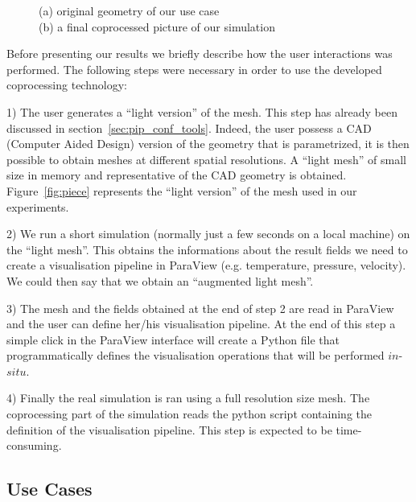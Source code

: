 \begin{figure}
\begin{subfigure}[b]{0.45\textwidth}
    \label{fig:res}
  \end{subfigure}
  \caption{(a) original geometry of our use case\\
  \hspace{8em}(b)  a final coprocessed picture of our simulation}
\end{figure}

Before presenting our results we briefly describe how the user interactions was
performed. The following steps were necessary in order to use the developed
coprocessing technology:


1) The user generates a ``light version'' of the mesh. This step has already been
discussed in section~\ref{sec:pip_conf_tools}. Indeed, the user possess a CAD (Computer Aided
Design) version of the geometry that is parametrized, it is then possible to
obtain meshes at different spatial resolutions. A ``light mesh'' of small size in
memory and representative of the CAD geometry is obtained. Figure~\ref{fig:piece} represents
the ``light version'' of the mesh used in our experiments.


2) We run a short simulation (normally just a few seconds on a local machine) on the ``light mesh''.
This obtains the informations about the result fields we need to create a
visualisation pipeline in ParaView (e.g. temperature, pressure, velocity). We
could then say that we obtain an ``augmented light mesh''.


3) The mesh and the fields obtained at the end of step 2 are read in ParaView
and the user can define her/his visualisation pipeline. At the end of this step
a simple click in the ParaView interface will create a Python file that
programmatically defines the visualisation operations that will be performed
$in$-$situ$.


4) Finally the real simulation is ran using a full resolution size mesh. The
coprocessing part of the simulation reads the python script containing the
definition of the visualisation pipeline. This step is expected to be
time-consuming.

\subsection{Use Cases}

